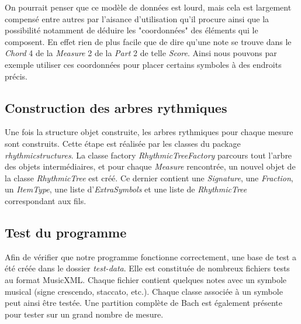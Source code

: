 \par
On pourrait penser que ce modèle de données est lourd, mais cela est largement compensé entre autres
par l'aisance d'utilisation qu'il procure ainsi que la possibilité notamment de déduire les
"coordonnées" des éléments qui le composent. En effet rien de plus facile que de dire
qu'une note se trouve dans le \emph{Chord} 4 de la \emph{Measure} 2 de la \emph{Part}
2 de telle \emph{Score}. Ainsi nous pouvons par exemple utiliser ces coordonnées pour
placer certains symboles à des endroits précis.


\subsection{Construction des arbres rythmiques}

Une fois la structure objet construite, les arbres rythmiques pour chaque mesure sont construits.
Cette étape est réalisée par les classes du package \emph{rhythmicstructures}. La classe factory
\emph{RhythmicTreeFactory} parcours tout l'arbre des objets intermédiaires, et pour chaque \emph{Measure}
rencontrée, un nouvel objet de la classe \emph{RhythmicTree} est créé. Ce dernier contient une
\emph{Signature}, une \emph{Fraction}, un \emph{ItemType}, une liste d'\emph{ExtraSymbols} et une
liste de \emph{RhythmicTree} correspondant aux fils.


\subsection{Test du programme}

Afin de vérifier que notre programme fonctionne correctement, une base de test a été créée dans le dossier \emph{test-data}. Elle est constituée de nombreux fichiers tests au format MusicXML. Chaque fichier contient quelques notes avec un symbole musical (signe crescendo, staccato, etc.). Chaque classe associée à un symbole peut ainsi être testée. Une partition complète de Bach est également présente pour tester sur un grand nombre de mesure.
